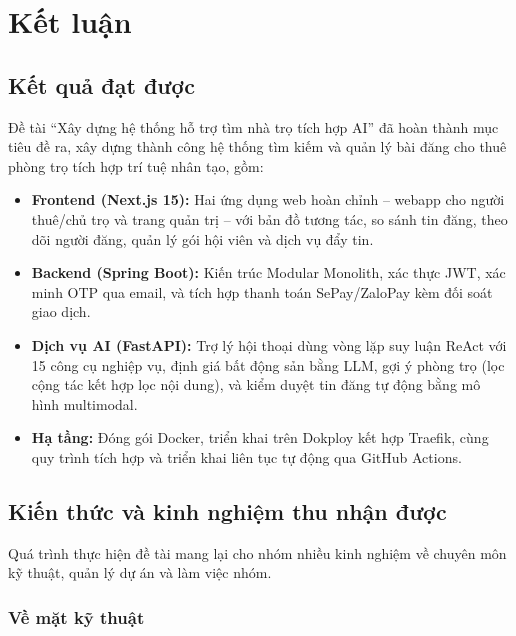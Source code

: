 \chapter{Kết luận}
\label{Chapter7}

\section{Kết quả đạt được}

Đề tài ``Xây dựng hệ thống hỗ trợ tìm nhà trọ tích hợp AI'' đã hoàn thành mục tiêu đề ra, xây dựng thành công hệ thống tìm kiếm và quản lý bài đăng cho thuê phòng trọ tích hợp trí tuệ nhân tạo, gồm:

\begin{itemize}
    \item \textbf{Frontend (Next.js 15):} Hai ứng dụng web hoàn chỉnh -- webapp cho người thuê/chủ trọ và trang quản trị -- với bản đồ tương tác, so sánh tin đăng, theo dõi người đăng, quản lý gói hội viên và dịch vụ đẩy tin.
    \item \textbf{Backend (Spring Boot):} Kiến trúc Modular Monolith, xác thực JWT, xác minh OTP qua email, và tích hợp thanh toán SePay/ZaloPay kèm đối soát giao dịch.
    \item \textbf{Dịch vụ AI (FastAPI):} Trợ lý hội thoại dùng vòng lặp suy luận ReAct với 15 công cụ nghiệp vụ, định giá bất động sản bằng LLM, gợi ý phòng trọ (lọc cộng tác kết hợp lọc nội dung), và kiểm duyệt tin đăng tự động bằng mô hình multimodal.
    \item \textbf{Hạ tầng:} Đóng gói Docker, triển khai trên Dokploy kết hợp Traefik, cùng quy trình tích hợp và triển khai liên tục tự động qua GitHub Actions.
\end{itemize}

\section{Kiến thức và kinh nghiệm thu nhận được}

Quá trình thực hiện đề tài mang lại cho nhóm nhiều kinh nghiệm về chuyên môn kỹ thuật, quản lý dự án và làm việc nhóm.

\FloatBarrier
\subsection{Về mặt kỹ thuật}

